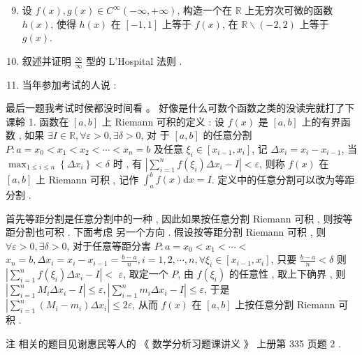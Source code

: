\documentclass[10pt]{article}
\begin{document}
\begin{enumerate}
  \setcounter{enumi}{8}
  \item  设  $f(x), g(x) \in C^{\infty}(-\infty,+\infty)$,  构造一个在  $\mathbb{R}$  上无穷次可微的函数  $h(x)$,  使得  $h(x)$  在  $[-1,1]$  上等于  $f(x)$,  在  $\mathbb{R} \backslash(-2,2)$  上等于  $g(x)$.

  \item  叙述并证明  $\frac{\infty}{\infty}$  型的  L'Hospital  法则 .

  \item  当年参加考试的人说  :

\end{enumerate}
 最后一题我考试时侯都没时间看  。 好像是什么可数个函数之类的没读完就打了下课軨  1.  函数在  $[a, b]$  上  Riemann  可积的定义 :  设  $f(x)$  是  $[a, b]$  上的有界函数 ,  如果  $\exists I \in \mathbb{R}, \forall \varepsilon>0, \exists \delta>0$,  对   于  $[a, b]$  的任意分割  $P: a=x_{0}<x_{1}<x_{2}<\cdots<x_{n}=b$  及任意  $\xi_{i} \in\left[x_{i-1}, x_{i}\right]$,  记  $\Delta x_{i}=x_{i}-x_{i-1}$,  当  $\max _{1 \leqslant i \leqslant n}\left\{\Delta x_{i}\right\}<\delta$  时 ,  有  $\left|\sum_{i=1}^{n} f\left(\xi_{i}\right) \Delta x_{i}-I\right|<\varepsilon$,  则称  $f(x)$  在  $[a, b]$  上  Riemann  可积 ,  记作  $\int_{a}^{b} f(x) \mathrm{d} x=I$.  定义中的任意分割可以改为等距分割 .

 首先等距分割是任意分割中的一种 ,  因此如果按任意分割  Riemann  可积 ,  则按等距分割也可积 .  下面考虑   另一个方向 .  假设按等距分割  Riemann  可积 ,  则  $\forall \varepsilon>0, \exists \delta>0$,  对于任意等距分害  $P: a=x_{0}<x_{1}<\cdots<$ $x_{n}=b, \Delta x_{i}=x_{i}-x_{i-1}=\frac{b-a}{n}, i=1,2, \cdots, n, \forall \xi_{i} \in\left[x_{i-1}, x_{i}\right]$,  只要  $\frac{b-a}{n}<\delta$  则  $\left|\sum_{i=1}^{n} f\left(\xi_{i}\right) \Delta x_{i}-I\right|<$ $\varepsilon$,  取定一个  $P$,  由  $f\left(\xi_{i}\right)$  的任意性 ,  取上下确界 ,  则  $\left|\sum_{i=1}^{n} M_{i} \Delta x_{i}-I\right| \leqslant \varepsilon,\left|\sum_{i=1}^{n} m_{i} \Delta x_{i}-I\right| \leqslant \varepsilon$,  于是  $\left|\sum_{i=1}^{n}\left(M_{i}-m_{i}\right) \Delta x_{i}\right| \leqslant 2 \varepsilon$,  从而  $f(x)$  在  $[a, b]$  上按任意分割  Riemann  可积 .

 注   相关的题目见谢惠民等人的 《 数学分析习题课讲义 》 上册第  335  页题  2 .
\end{document}
